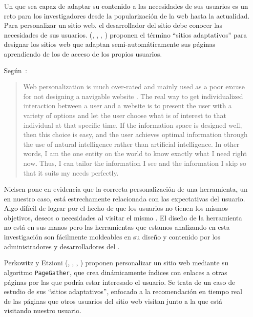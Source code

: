 
Un \portalWeb que sea capaz de adaptar su contenido a las necesidades de sus usuarios es un reto para los investigadores desde la popularización de la web hasta la actualidad. Para personalizar un sitio web, el desarrollador del sitio debe conocer las necesidades de sus usuarios. \citeauthor{PerkowitzEtzioni-AdaptiveSites-1997} (\cite*{PerkowitzEtzioni-AdaptiveSites-1997}, \cite*{PerkowitzEtzioni_AWSAnAIChallenge_1997}, \cite*{PerkowitzEtzioni_AWSAutomaticallySynthesizingWebPages_1998}, \cite*{PerkowitzEtzioni_AdaptiveWebSites_2000}) proponen el término "`sitios adaptativos"' para designar los sitios web que adaptan semi-automáticamente sus páginas aprendiendo de los \patrones de acceso de los propios usuarios.

Según~\citet{Nielsen_PersonalizationIsOverRated_1998}:

\begin{quotation}
  Web personalization is much over-rated and mainly used as a poor excuse for not designing a navigable website . The real way to get individualized interaction between a user and a website is to present the user with a variety of options and let the user choose what is of interest to that individual at that specific time. If the information space is designed well, then this choice is easy, and the user achieves optimal information through the use of natural intelligence rather than artificial intelligence. In other words, I am the one entity on the world to know exactly what I need right now. Thus, I can tailor the information I see and the information I skip so that it suits my needs perfectly.
\end{quotation}

Nielsen pone en evidencia que la correcta personalización de una herramienta, un \portalWeb en nuestro caso, está estrechamente relacionada con las expectativas del usuario. Algo difícil de lograr por el hecho de que los usuarios no tienen los mismos objetivos, deseos o necesidades al visitar el mismo \portalWeb. El diseño de la herramienta no está en sus manos pero las herramientas que estamos analizando en esta investigación son fácilmente moldeables en su diseño y contenido por los administradores y desarrolladores del \portalWeb.

Perkowitz y Etzioni (\cite*{PerkowitzEtzioni_AWSAutomaticallySynthesizingWebPages_1998}, \cite*{PerkowitzEtzioni_TowardsAdaptiveWebSites_1999}, \cite*{PerkowitzEtzioni_AWSConceptualClusterMining_1999}, \cite*{PerkowitzEtzioni_TowardsAdaptiveWebSites_2000}) proponen personalizar un sitio web mediante su algoritmo \texttt{PageGather}, que crea dinámicamente índices con enlaces a otras páginas por las que podría estar interesado el usuario. Se trata de un caso de estudio de sus "`sitios adaptativos"', enfocado a la recomendación en tiempo real de las páginas que otros usuarios del sitio web visitan junto a la que está visitando nuestro usuario.

